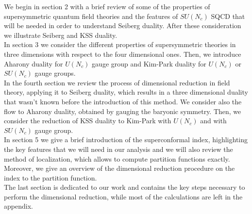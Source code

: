 We begin in section 2 with a brief review of some of the properties of supersymmetric quantum field theories and the features of $SU(N_c)$ SQCD that will be needed in order to understand Seiberg duality.
After these consideration we illustrate Seiberg and KSS duality.\\
In section 3 we consider the different properties of supersymmetric theories in three dimensions with respect to the four dimensional ones.
Then, we introduce Aharony duality for $U(N_c)$ gauge group and Kim-Park duality for $U(N_c)$ or $SU(N_c)$ gauge groups.\\
In the fourth section we review the process of dimensional reduction in field theory, applying it to Seiberg duality, which results in a three dimensional duality that wasn't known before the introduction of this method. 
We  consider also the flow to Aharony duality, obtained by gauging the baryonic symmetry.
Then, we consider the reduction of KSS duality to Kim-Park with $U(N_c)$ and with $SU(N_c)$ gauge group.
\\
In section 5 we give a brief introduction of the superconformal index, highlighting the key features that we will need in our analysis and we will also review the method of localization, which allows to compute partition functions exactly.
Moreover, we give an overview of the dimensional reduction procedure on the index to the partition function.
\\
The last section is dedicated to our work and contains the key steps necessary to perform the dimensional reduction, while most of the calculations are left in the appendix.



